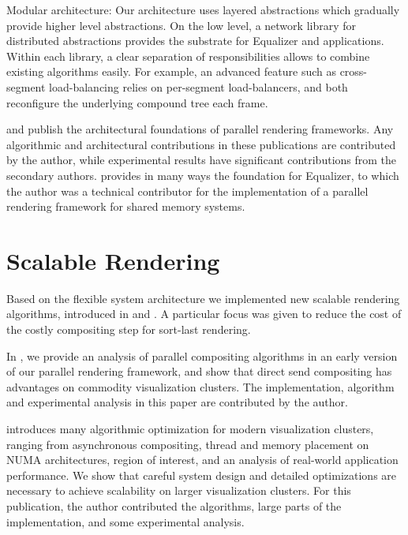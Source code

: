 \begin{compactdesc}
\item[Modular architecture:] Our architecture uses layered abstractions which
gradually provide higher level abstractions. On the low level, a network library
for distributed abstractions provides the substrate for Equalizer and
applications. Within each library, a clear separation of responsibilities allows
to combine existing algorithms easily. For example, an advanced feature such as
cross-segment load-balancing relies on per-segment load-balancers, and both
reconfigure the underlying compound tree each frame.

\end{compactdesc}

\cite{EMP:09} and \cite{ESP:18} publish the architectural foundations of
parallel rendering frameworks. Any algorithmic and architectural contributions
in these publications are contributed by the author, while experimental results
have significant contributions from the secondary authors. \cite{BRE:05}
provides in many ways the foundation for Equalizer, to which the author was a
technical contributor for the implementation of a parallel rendering framework
for shared memory systems.

\section{Scalable Rendering}

Based on the flexible system architecture we implemented new scalable rendering
algorithms, introduced in \cite{EMP:09} and \cite{ESP:18}. A particular focus
was given to reduce the cost of the costly compositing step for sort-last
rendering.

In \cite{EP:07}, we provide an analysis of parallel compositing algorithms in an
early version of our parallel rendering framework, and show that direct send
compositing has advantages on commodity visualization clusters. The
implementation, algorithm and experimental analysis in this paper are
contributed by the author.

\cite{EBAHMP:12} introduces many algorithmic optimization for modern
visualization clusters, ranging from asynchronous compositing, thread and memory
placement on NUMA architectures, region of interest, and an analysis of
real-world application performance. We show that careful system design and
detailed optimizations are necessary to achieve scalability on larger
visualization clusters. For this publication, the author contributed the
algorithms, large parts of the implementation, and some experimental analysis.

